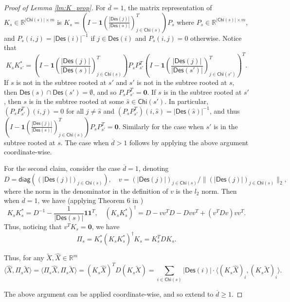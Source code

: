 \documentclass[10pt]{article}
\newcommand{\mb}{\mathbf}
\newcommand{\R}{\mathbb{R}}
\newcommand{\diag}{\mathsf{diag}}
\newcommand{\child}{\mathsf{Chi}}
\newcommand{\Descendant}{\mathsf{Des}}
\begin{document}
\begin{proof}[Proof of Lemma \ref{lm:K_prop}]
    For $\overline{d}=1$, the matrix representation of $K_s\in \R^{|\child(s)|\times m}$ is $K_s = (I - \mb 1(\frac{|\Descendant(j)|}{|\Descendant(s)|})_{j\in \child(s)}^T)P_s$ where $P_s\in \R^{|\child(s)|\times m}$, and $P_s(i,j) = |\Descendant(i)|^{-1}$ if $j\in \Descendant(i)$ and $P_s(i,j)=0$ otherwise. Notice that
\begin{displaymath}
    K_sK_{s'}^* = (I - \mb 1(\frac{|\Descendant(j)|}{|\Descendant(s)|})_{j\in \child(s)}^T)P_sP_{s'}^T(I - \mb 1(\frac{|\Descendant(j)|}{|\Descendant(s')|})_{j\in \child(s')}^T)^T.
\end{displaymath}
If $s$ is not in the subtree rooted at $s'$ and $s'$ is not in the subtree rooted at $s$, then $\Descendant(s)\cap \Descendant(s') = \emptyset$, and so $P_sP_{s'}^T = \mb 0$. If $s$ is in the subtree rooted at $s'$, then $s$ is in the subtree rooted at some $\widehat{s}\in \child(s')$. In particular, $(P_sP_{s'}^T)(i,j) = 0$ for all $j\neq \widehat{s}$ and $(P_sP_{s'}^T)(i,\widehat{s}) = |\Descendant(\widehat{s})|^{-1}$, and thus $(I - \mb 1(\frac{|\Descendant(j)|}{|\Descendant(s)|})_{j\in \child(s)}^T)P_sP_{s'}^T = \mb 0$. Similarly for the case when $s'$ is in the subtree rooted at $s$. The case when $\overline{d}>1$ follows by applying the above argument coordinate-wise.


For the second claim, consider the case $\overline{d}=1$, denoting 
\begin{displaymath}
    D = \diag((|\Descendant(j)|)_{j\in \child(s)}),\quad v = (|\Descendant(j)|)_{j\in \child(s)}/\|(|\Descendant(j)|)_{j\in \child(s)}\|_2,
\end{displaymath}
where the norm in the denominator in the definition of $v$ is the $l_2$ norm. Then when $\overline{d}=1$, we have (applying Theorem 6 in \cite{Meyer1973Generalized})
\begin{equation}\label{eq:K_prod}
    K_sK_{s}^* = D^{-1} - \frac{1}{|\Descendant(s)|}\mb 1\mb 1^T,\quad (K_sK_{s}^*)^{\dagger} = D - vv^TD - Dvv^T + (v^TDv)vv^T.
\end{equation}
Thus, noticing that $v^TK_s = \mb 0$, we have 
\begin{displaymath}
    \Pi_s = K_s^*(K_sK_s^*)^{\dagger}K_s = K_s^TDK_s.
\end{displaymath}

Thus, for any $\widetilde{X},\widehat{X}\in \R^{m}$
    \begin{displaymath}
        \langle \widehat{X},\Pi_s\widetilde{X}\rangle=\langle \Pi_s\widehat{X},\Pi_s\widetilde{X}\rangle= (K_s\widehat{X})^TD(K_s\widetilde{X})= \sum_{i\in \child(s)} |\Descendant(i)| \cdot \langle (K_s\widehat{X})_i,(K_s\widetilde{X})_i\rangle.
    \end{displaymath}

The above argument can be applied coordinate-wise, and so extend to $\overline{d}\geq 1$.
\end{proof}
\end{document}
